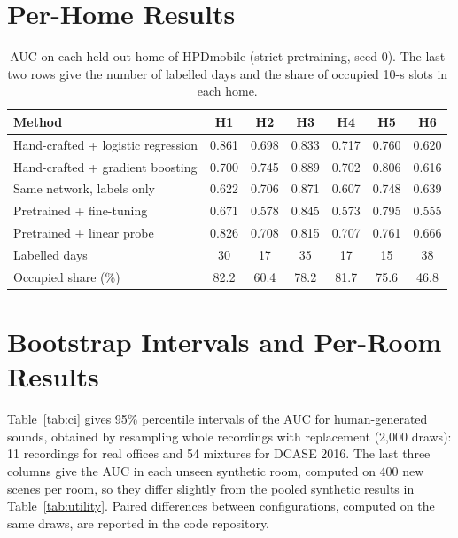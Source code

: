 \documentclass[11pt]{article}
\begin{document}
\appendix
\section{Per-Home Results}
\begin{table}[h]
\centering\small
\caption{AUC on each held-out home of HPDmobile (strict pretraining, seed 0). The last two rows give the number of labelled days and the share of occupied 10-s slots in each home.}
\begin{tabular}{@{}lcccccc@{}}
\toprule
Method & H1 & H2 & H3 & H4 & H5 & H6 \\
\midrule
Hand-crafted + logistic regression & 0.861 & 0.698 & 0.833 & 0.717 & 0.760 & 0.620 \\
Hand-crafted + gradient boosting & 0.700 & 0.745 & 0.889 & 0.702 & 0.806 & 0.616 \\
Same network, labels only & 0.622 & 0.706 & 0.871 & 0.607 & 0.748 & 0.639 \\
Pretrained + fine-tuning & 0.671 & 0.578 & 0.845 & 0.573 & 0.795 & 0.555 \\
Pretrained + linear probe & 0.826 & 0.708 & 0.815 & 0.707 & 0.761 & 0.666 \\
\midrule
Labelled days & 30 & 17 & 35 & 17 & 15 & 38 \\
Occupied share (\%) & 82.2 & 60.4 & 78.2 & 81.7 & 75.6 & 46.8 \\
\bottomrule
\end{tabular}
\end{table}

\section{Bootstrap Intervals and Per-Room Results}
\label{app:ci}
Table~\ref{tab:ci} gives 95\% percentile intervals of the AUC for human-generated sounds, obtained by resampling whole recordings with replacement (2,000 draws): 11 recordings for real offices and 54 mixtures for DCASE 2016. The last three columns give the AUC in each unseen synthetic room, computed on 400 new scenes per room, so they differ slightly from the pooled synthetic results in Table~\ref{tab:utility}. Paired differences between configurations, computed on the same draws, are reported in the code repository.
\end{document}
